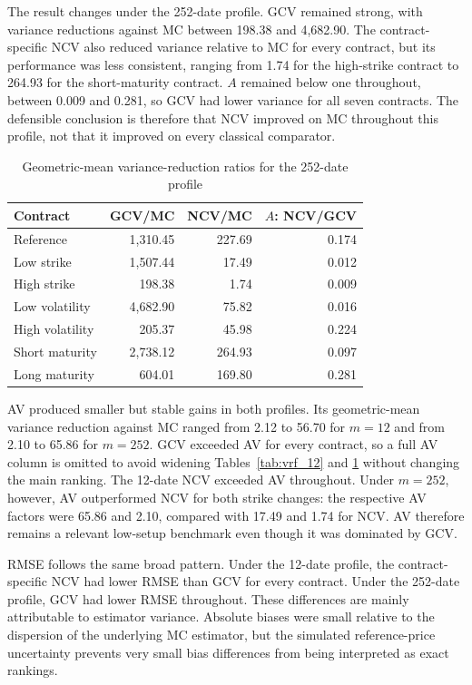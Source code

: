 The result changes under the 252-date profile. GCV remained strong, with variance reductions against MC between 198.38 and 4{,}682.90. The contract-specific NCV also reduced variance relative to MC for every contract, but its performance was less consistent, ranging from 1.74 for the high-strike contract to 264.93 for the short-maturity contract. $A$ remained below one throughout, between 0.009 and 0.281, so GCV had lower variance for all seven contracts. The defensible conclusion is therefore that NCV improved on MC throughout this profile, not that it improved on every classical comparator.

\begin{table}[htbp]
    \centering
    \caption{Geometric-mean variance-reduction ratios for the 252-date profile}
    \label{tab:vrf_252}
    \begin{tabular}{lrrr}
        \hline
        Contract & GCV/MC & NCV/MC & $A$: NCV/GCV \\
        \hline
        Reference & 1{,}310.45 & 227.69 & 0.174 \\
        Low strike & 1{,}507.44 & 17.49 & 0.012 \\
        High strike & 198.38 & 1.74 & 0.009 \\
        Low volatility & 4{,}682.90 & 75.82 & 0.016 \\
        High volatility & 205.37 & 45.98 & 0.224 \\
        Short maturity & 2{,}738.12 & 264.93 & 0.097 \\
        Long maturity & 604.01 & 169.80 & 0.281 \\
        \hline
    \end{tabular}
\end{table}

AV produced smaller but stable gains in both profiles. Its geometric-mean variance reduction against MC ranged from 2.12 to 56.70 for $m = 12$ and from 2.10 to 65.86 for $m = 252$. GCV exceeded AV for every contract, so a full AV column is omitted to avoid widening Tables~\ref{tab:vrf_12} and \ref{tab:vrf_252} without changing the main ranking. The 12-date NCV exceeded AV throughout. Under $m = 252$, however, AV outperformed NCV for both strike changes: the respective AV factors were 65.86 and 2.10, compared with 17.49 and 1.74 for NCV. AV therefore remains a relevant low-setup benchmark even though it was dominated by GCV.

RMSE follows the same broad pattern. Under the 12-date profile, the contract-specific NCV had lower RMSE than GCV for every contract. Under the 252-date profile, GCV had lower RMSE throughout. These differences are mainly attributable to estimator variance. Absolute biases were small relative to the dispersion of the underlying MC estimator, but the simulated reference-price uncertainty prevents very small bias differences from being interpreted as exact rankings.

